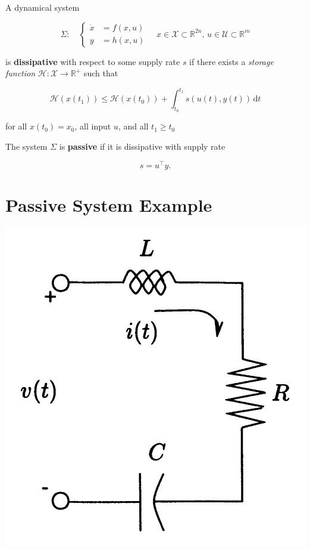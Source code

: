 \documentclass[
]{report}
\begin{document}
A dynamical system

\[
\Sigma: \quad
\begin{cases}
  \dot{x} &= f(x,u) \\
  y &= h(x,u)
\end{cases}
\quad x \in \mathcal{X} \subset \mathbb{R}^{2n}, \, u \in \mathcal{U} \subset \mathbb{R}^{m} 
\]

is \textbf{dissipative} with respect to some supply rate \(s\) if there
exists a \emph{storage function}
\(\mathcal{H}: \mathcal{X} \to \mathbb{R}^{+}\) such that

\[
\mathcal{H}\left(  x(t_1) \right) \leq  \mathcal{H}\left(  x(t_0) \right) + \int_{t_0}^{t_1} s(u(t), y(t)) \, \text{d}t
\]

for all \(x(t_0) = x_0\), all input \(u\), and all \(t_1 \geq t_0\)

The system \(\Sigma\) is \textbf{passive} if it is dissipative with
supply rate

\[s = u^\top y.\]

\hypertarget{passive-system-example}{%
\section{Passive System Example}\label{passive-system-example}}

\includegraphics{contents/assets/passive-system-example.png}
\end{document}
